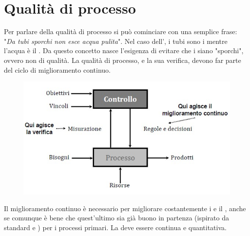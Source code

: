 \documentclass[../main]{subfiles}
\begin{document}
\section{Qualità di processo}
Per parlare della qualità di processo si può cominciare con una semplice frase: "\textit{Da tubi sporchi non esce acqua pulita}". Nel caso dell', i tubi sono i  mentre l'acqua è il .\newline
Da questo concetto nasce l'esigenza di evitare che i  siano "sporchi", ovvero non di qualità. La qualità di processo, e la sua verifica, devono far parte del ciclo di miglioramento continuo.
\begin{figure}[h]
    \begin{center}
        \includegraphics[scale=0.8]{immagini/processo.jpg}
    \end{center}
\end{figure}
Il miglioramento continuo è necessario per migliorare costantemente i  e il , anche se comunque è bene che quest'ultimo sia già buono in partenza (ispirato da standard e ) per i processi primari. La  deve essere continua e quantitativa.\newline
\end{document}
